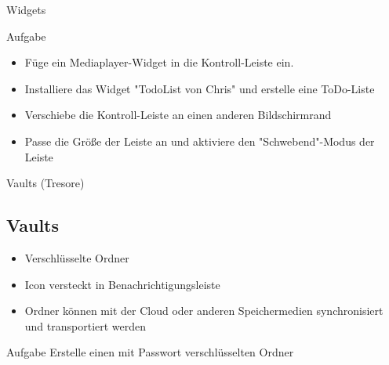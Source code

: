 \begin{frame}{Widgets}
    \begin{alertblock}{Aufgabe}
        \begin{itemize}
            \item Füge ein Mediaplayer-Widget in die Kontroll-Leiste ein.
            \item Installiere das Widget "TodoList von Chris" und erstelle eine ToDo-Liste
            \item Verschiebe die Kontroll-Leiste an einen anderen Bildschirmrand
            \item Passe die Größe der Leiste an und aktiviere den "Schwebend"-Modus der Leiste
        \end{itemize}
    \end{alertblock}
\end{frame}

\begin{frame}{Vaults (Tresore)}
    \subsection{Vaults}\label{subsec:vaults}
    \begin{itemize}
        \item Verschlüsselte Ordner\pause
        \item Icon versteckt in Benachrichtigungsleiste\pause
        \item Ordner können mit der Cloud oder anderen Speichermedien synchronisiert und
        transportiert werden
    \end{itemize}

    \pause
    \vspace{0.5cm}
    \begin{alertblock}{Aufgabe}
        Erstelle einen mit Passwort verschlüsselten Ordner
    \end{alertblock}
\end{frame}